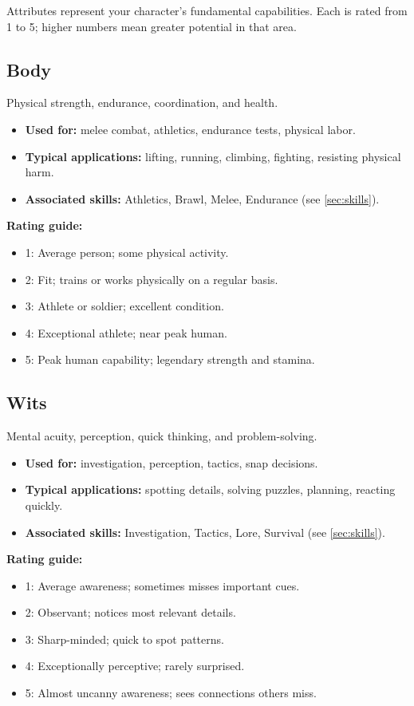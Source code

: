 Attributes represent your character's fundamental capabilities. Each is rated
from 1 to 5; higher numbers mean greater potential in that area.

\subsection{Body}
\label{sec:attribute-body}
Physical strength, endurance, coordination, and health.
\begin{itemize}
  \item \textbf{Used for:} melee combat, athletics, endurance tests, physical labor.
  \item \textbf{Typical applications:} lifting, running, climbing, fighting, resisting physical harm.
  \item \textbf{Associated skills:} Athletics, Brawl, Melee, Endurance (see \ref{sec:skills}).
\end{itemize}
\textbf{Rating guide:}
\begin{itemize}
  \item 1: Average person; some physical activity.
  \item 2: Fit; trains or works physically on a regular basis.
  \item 3: Athlete or soldier; excellent condition.
  \item 4: Exceptional athlete; near peak human.
  \item 5: Peak human capability; legendary strength and stamina.
\end{itemize}

\subsection{Wits}
\label{sec:attribute-wits}
Mental acuity, perception, quick thinking, and problem-solving.
\begin{itemize}
  \item \textbf{Used for:} investigation, perception, tactics, snap decisions.
  \item \textbf{Typical applications:} spotting details, solving puzzles, planning, reacting quickly.
  \item \textbf{Associated skills:} Investigation, Tactics, Lore, Survival (see \ref{sec:skills}).
\end{itemize}
\textbf{Rating guide:}
\begin{itemize}
  \item 1: Average awareness; sometimes misses important cues.
  \item 2: Observant; notices most relevant details.
  \item 3: Sharp-minded; quick to spot patterns.
  \item 4: Exceptionally perceptive; rarely surprised.
  \item 5: Almost uncanny awareness; sees connections others miss.
\end{itemize}

